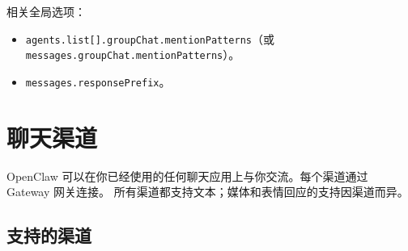 相关全局选项：

\begin{itemize}
  \item \texttt{agents.list[].groupChat.mentionPatterns}（或 \texttt{messages.groupChat.mentionPatterns}）。
  \item \texttt{messages.responsePrefix}。
\end{itemize}



\clearpage

\section{聊天渠道}


OpenClaw 可以在你已经使用的任何聊天应用上与你交流。每个渠道通过 Gateway 网关连接。
所有渠道都支持文本；媒体和表情回应的支持因渠道而异。

\subsection{支持的渠道}


